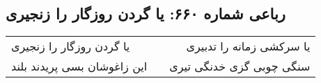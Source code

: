 \begin{center}
\section*{رباعی شماره ۶۶۰: یا گردن روزگار را زنجیری}
\label{sec:sh660}
\begin{longtable}{l p{0.5cm} r}
یا گردن روزگار را زنجیری
&&
یا سرکشی زمانه را تدبیری
\\
این زاغوشان بسی پریدند بلند
&&
سنگی چوبی گزی خدنگی تیری
\\
\end{longtable}
\end{center}

